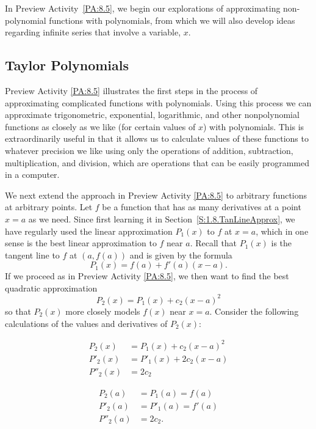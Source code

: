 In Preview Activity~\ref{PA:8.5}, we begin our explorations of approximating non-polynomial functions with polynomials, from which we will also develop ideas regarding infinite series that involve a variable, $x$.



\subsection*{Taylor Polynomials} 

Preview Activity \ref{PA:8.5} illustrates the first steps in the process of approximating complicated functions with polynomials. Using this process we can approximate trigonometric, exponential, logarithmic, and other nonpolynomial functions as closely as we like (for certain values of $x$) with polynomials. This is extraordinarily useful in that it allows us to calculate values of these functions to whatever precision we like using only the operations of addition, subtraction, multiplication, and division, which are operations that can be easily programmed in a computer.

We next extend the approach in Preview Activity \ref{PA:8.5} to arbitrary functions at arbitrary points. Let $f$ be a function that has as many derivatives at a point $x=a$ as we need. Since first learning it in Section~\ref{S:1.8.TanLineApprox}, we have regularly used the linear approximation $P_1(x)$ to $f$ at $x=a$, which in one sense is the best linear approximation to $f$ near $a$.  Recall that $P_1(x)$  is the tangent line to $f$ at $(a,f(a))$ and is given by the formula
\[P_1(x) = f(a) + f'(a)(x-a).\]
If we proceed as in Preview Activity \ref{PA:8.5}, we then want to find the best quadratic approximation
\[P_2(x) = P_1(x) + c_2(x-a)^2\]
so that $P_2(x)$ more closely models $f(x)$ near $x=a$.
Consider the following calculations of the values and derivatives of $P_2(x)$:
\begin{figure}[h]
\begin{center}
\begin{minipage}{3in}
\begin{align*}
P_2(x) &= P_1(x) + c_2(x-a)^2 \\
P'_2(x) &= P'_1(x) + 2c_2(x-a) \\
P''_2(x) &= 2c_2
\end{align*}
\end{minipage}
\begin{minipage}{3in}
\begin{align*}
P_2(a) &= P_1(a) = f(a) \\
P'_2(a) &= P'_1(a) = f'(a) \\
P''_2(a) &= 2c_2.
\end{align*}
\end{minipage}
\end{center}
\end{figure}

